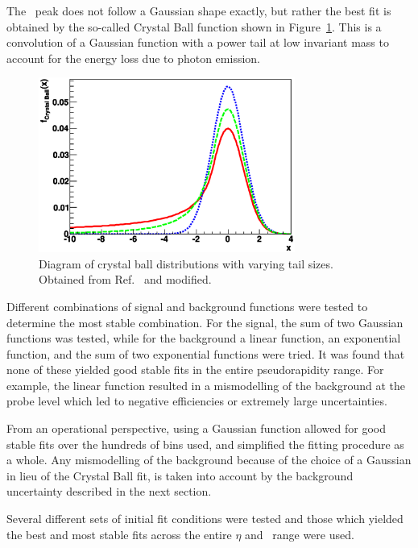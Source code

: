 The \jpsi\ peak does not follow a Gaussian shape exactly, but rather the best fit is obtained by the so-called Crystal Ball function shown in Figure~\ref{fig:CalibrationCBDist}. This is a convolution of a Gaussian function with a power tail at low invariant mass to account for the energy loss due to photon emission.

\begin{figure}[htbp]
  \centering
  \includegraphics[width=0.75\textwidth]{PartCalibration2012/Plots/CrystalBallFunction.eps}
  \caption[Diagram of crystal ball distributions with varying tail sizes.]{Diagram of crystal ball distributions with varying tail sizes. Obtained from Ref.~\cite{Calibration:CBFunction} and modified.}\label{fig:CalibrationCBDist}
\end{figure}

Different combinations of signal and background functions were tested to determine the most stable combination. For the signal, the sum of two Gaussian functions was tested, while for the background a linear function, an exponential function, and the sum of two exponential functions were tried. It was found that none of these yielded good stable fits in the entire pseudorapidity range. For example, the linear function resulted in a mismodelling of the background at the probe level which led to negative efficiencies or extremely large uncertainties. 

From an operational perspective, using a Gaussian function allowed for good stable fits over the hundreds of bins used, and simplified the fitting procedure as a whole. Any mismodelling of the background because of the choice of a Gaussian in lieu of the Crystal Ball fit, is taken into account by the background uncertainty described in the next section.

Several different sets of initial fit conditions were tested and those which yielded the best and most stable fits across the entire $\eta$ and \pt\ range were used. 

